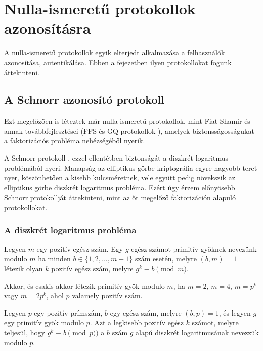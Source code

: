 \chapter{Nulla-ismeretű protokollok azonosításra}

A nulla-ismeretű protokollok egyik elterjedt alkalmazása a felhasználók azonosítása, autentikálása. Ebben a fejezetben ilyen protokollokat fogunk áttekinteni.

\section*{A Schnorr azonosító protokoll}

Ezt megelőzően is léteztek már nulla-ismeretű protokollok, mint Fiat-Shamir \cite{FiatShamir} és annak továbbfejlesztései (FFS \cite{FeigeFiatShamir} és GQ protokollok \cite{GuillouQuisquater}), amelyek biztonsságosságukat a faktorizációs probléma nehézségéből nyerik. 

A Schnorr protokoll \cite{Schnorr}, ezzel ellentétben biztonságát a diszkrét logaritmus problémából nyeri. Manapság az elliptikus görbe kriptográfia egyre nagyobb teret nyer, köszönhetően a kisebb kulcsméretnek, vele együtt pedig növekszik az elliptikus görbe diszkrét logaritmus probléma. Ezért úgy érzem előnyösebb Schnorr protokollját áttekinteni, mint az őt megelőző faktorizáción alapuló protokollokat.

\subsection*{A diszkrét logaritmus probléma}\cite{BerczesPetho}

\begin{definition}
    Legyen $m$ egy pozitív egész szám. Egy $g$ egész számot primitív gyöknek nevezünk modulo $m$ ha minden $b \in \{1,2,...,m-1\}$ szám esetén, melyre $(b,m) = 1$ létezik olyan $k$ pozitív egész szám, melyre $g^k \equiv b \pmod{m}$.
\end{definition}

\begin{theorem}
    Akkor, és csakis akkor létezik primitív gyök modulo $m$, ha $m = 2$, $m = 4$, $m = p^k$ vagy $m = 2p^k$, ahol $p$ valamely pozitív szám.
\end{theorem}

\begin{definition}
    Legyen $p$ egy pozitív prímszám, $b$ egy egész szám, melyre $(b, p) = 1$, és legyen $g$ egy primitív gyök modulo $p$. Azt a legkisebb pozitív egész $k$ számot, melyre teljesül, hogy $g^k \equiv b \pmod{p})$ a $b$ szám $g$ alapú diszkrét logaritmusának nevezzük modulo $p$.
\end{definition}

